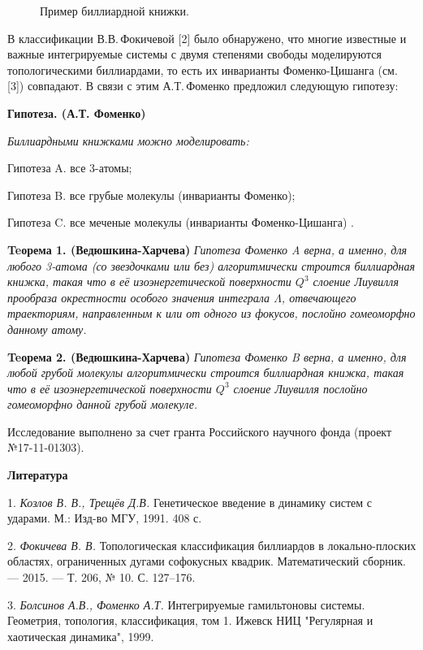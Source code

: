 \begin{figure}[h!]
	\caption{Пример биллиардной книжки. \label{3obl}}
\end{figure}

В классификации В.В.\,Фокичевой [2]  было обнаружено, что многие известные и важные интегрируемые системы с двумя степенями свободы моделируются топологическими  биллиардами, то есть их инварианты Фоменко-Цишанга (см. [3]) совпадают. В связи с этим А.Т.\,Фоменко предложил следующую гипотезу:

\textbf{Гипотеза. (А.Т. Фоменко)}
{\it Биллиардными книжками можно моделировать:

	Гипотеза A. все 3-атомы;

	Гипотеза B. все грубые молекулы (инварианты Фоменко);

	Гипотеза C. все меченые молекулы (инварианты Фоменко-Цишанга) .
}

\textbf{Teорема 1. (Ведюшкина-Харчева)}  {\it Гипотеза Фоменко A верна, а именно, для любого 3-атома (со звездочками или без) алгоритмически строится биллиардная книжка, такая что в её изоэнергетической поверхности $ Q^3 $ слоение Лиувилля прообраза окрестности особого значения интеграла $ \Lambda $, отвечающего траекториям, направленным к или от одного из фокусов, послойно гомеоморфно данному атому.}

\textbf{Teорема 2. (Ведюшкина-Харчева)}  {\it Гипотеза Фоменко B верна, а именно, для любой грубой молекулы алгоритмически строится биллиардная книжка, такая что в её изоэнергетической поверхности $ Q^3 $ слоение Лиувилля послойно гомеоморфно данной грубой молекуле.}

\vspace{\baselineskip}
Исследование выполнено за счет гранта Российского научного фонда (проект №17-11-01303).

\smallskip \centerline{\bf Литература}\nopagebreak

1. {\it  Козлов В. В., Трещёв Д.В.} Генетическое введение в динамику систем с ударами. М.:  Изд-во МГУ, 1991. 408 с.

2. {\it Фокичева В. В.} Топологическая классификация биллиардов в локально-плоских областях, ограниченных дугами софокусных квадрик. Математический сборник. — 2015. — Т. 206, № 10. С. 127–176.

3. {\it Болсинов А.В., Фоменко А.Т.} Интегрируемые гамильтоновы системы. Геометрия, топология, классификация, том 1. Ижевск НИЦ "Регулярная и хаотическая динамика", 1999.
